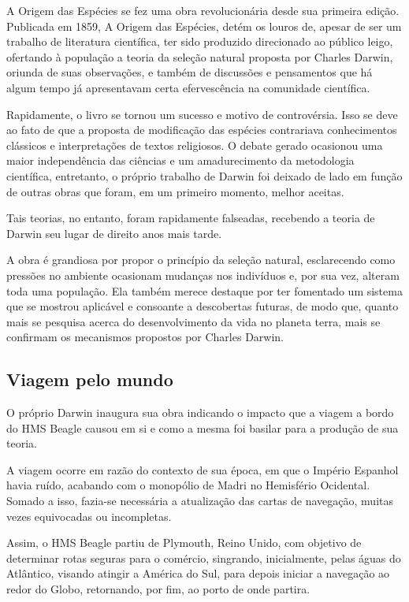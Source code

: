 \documentclass[12pt]{extarticle}
\begin{document}
A Origem das Espécies se fez uma obra revolucionária desde sua primeira
edição. Publicada em 1859, A Origem das Espécies, detém os louros de,
apesar de ser um trabalho de literatura científica, ter sido produzido
direcionado ao público leigo, ofertando à população a teoria da seleção
natural proposta por Charles Darwin, oriunda de suas observações, e
também de discussões e pensamentos que há algum tempo já apresentavam
certa efervescência na comunidade científica.

Rapidamente, o livro se tornou um sucesso e motivo de controvérsia. Isso
se deve ao fato de que a proposta de modificação das espécies
contrariava conhecimentos clássicos e interpretações de textos
religiosos. O debate gerado ocasionou uma maior independência das
ciências e um amadurecimento da metodologia científica, entretanto, o
próprio trabalho de Darwin foi deixado de lado em função de outras obras
que foram, em um primeiro momento, melhor aceitas.

Tais teorias, no entanto, foram rapidamente falseadas, recebendo a
teoria de Darwin seu lugar de direito anos mais tarde.

A obra é grandiosa por propor o princípio da seleção natural,
esclarecendo como pressões no ambiente ocasionam mudanças nos indivíduos
e, por sua vez, alteram toda uma população. Ela também merece destaque
por ter fomentado um sistema que se mostrou aplicável e consoante a
descobertas futuras, de modo que, quanto mais se pesquisa acerca do
desenvolvimento da vida no planeta terra, mais se confirmam os
mecanismos propostos por Charles Darwin.


\subsection{Viagem pelo mundo}

O próprio Darwin inaugura sua obra indicando o impacto que a viagem a
bordo do HMS Beagle causou em si e como a mesma foi basilar para a
produção de sua teoria.




A viagem ocorre em razão do contexto de sua época, em que o Império
Espanhol havia ruído, acabando com o monopólio de Madri no Hemisfério
Ocidental. Somado a isso, fazia-se necessária a atualização das cartas
de navegação, muitas vezes equivocadas ou incompletas.

Assim, o HMS Beagle partiu de Plymouth, Reino Unido, com objetivo de
determinar rotas seguras para o comércio, singrando, inicialmente, pelas
águas do Atlântico, visando atingir a América do Sul, para depois
iniciar a navegação ao redor do Globo, retornando, por fim, ao porto de
onde partira.
\end{document}

